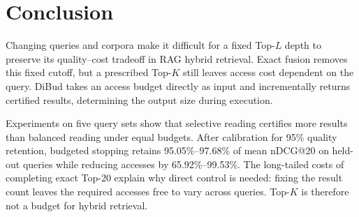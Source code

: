 \section{Conclusion}

\label{conclusion}

Changing queries and corpora make it difficult for a fixed Top-\(L\) depth to preserve its quality--cost tradeoff in RAG hybrid retrieval. Exact fusion removes this fixed cutoff, but a prescribed Top-\(K\) still leaves access cost dependent on the query. DiBud takes an access budget directly as input and incrementally returns certified results, determining the output size during execution.

Experiments on five query sets show that selective reading certifies more results than balanced reading under equal budgets. After calibration for 95\% quality retention, budgeted stopping retains 95.05\%--97.68\% of mean nDCG@20 on held-out queries while reducing accesses by 65.92\%--99.53\%. The long-tailed costs of completing exact Top-20 explain why direct control is needed: fixing the result count leaves the required accesses free to vary across queries. Top-\(K\) is therefore not a budget for hybrid retrieval.
